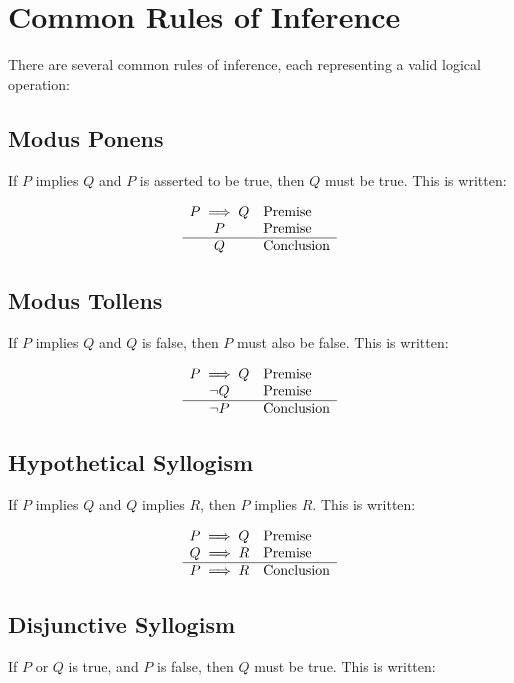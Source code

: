 \section{Common Rules of Inference}

There are several common rules of inference, each representing a valid logical operation:

\subsection{Modus Ponens} If $P$ implies $Q$ and $P$ is asserted to be true, then $Q$ must be true. This is written:

\[
    \begin{array}{ c l }
        P \implies Q & \text{Premise} \\
        P & \text{Premise} \\
        \hline
        Q & \text{Conclusion}
    \end{array}
\]

\subsection{Modus Tollens} If $P$ implies $Q$ and $Q$ is false, then $P$ must also be false. This is written:

\[
    \begin{array}{ c l }
        P \implies Q & \text{Premise} \\
        \neg Q & \text{Premise} \\
        \hline
        \neg P & \text{Conclusion}
    \end{array}
\]

\subsection{Hypothetical Syllogism} If $P$ implies $Q$ and $Q$ implies $R$, then $P$ implies $R$. This is written:

\[
    \begin{array}{ c l }
        P \implies Q & \text{Premise} \\
        Q \implies R & \text{Premise} \\
        \hline
        P \implies R & \text{Conclusion}
    \end{array}
\]

\subsection{Disjunctive Syllogism} If $P$ or $Q$ is true, and $P$ is false, then $Q$ must be true. This is written:

